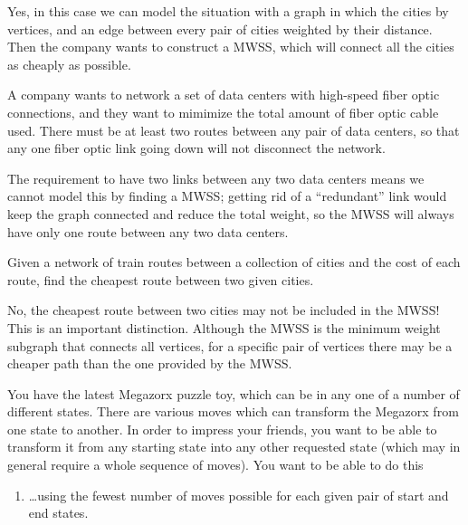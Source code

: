 \documentclass{tufte-handout}
\begin{document}
\begin{questions}
\begin{subquestions}
    \begin{answer}
      Yes, in this case we can model the situation with a graph in
      which the cities by vertices, and an edge between every pair of
      cities weighted by their distance.  Then the company wants to
      construct a MWSS, which will connect all the cities as cheaply as possible.
    \end{answer}
  \item A company wants to network a set of data centers with
    high-speed fiber optic connections, and they want to mimimize the
    total amount of fiber optic cable used. There must be at least two
    routes between any pair of data centers, so that any one fiber
    optic link going down will not disconnect the network.

    \begin{answer}
      The requirement to have two links between any two data centers
      means we cannot model this by finding a MWSS; getting rid of a
      ``redundant'' link would keep the graph connected and reduce the
      total weight, so the MWSS will always have only one route
      between any two data centers.
    \end{answer}
  \item Given a network of train routes between a collection of
    cities and the cost of each route, find the cheapest route between
    two given cities.

    \begin{answer}
      No, the cheapest route between two cities may not be included in the
      MWSS!  This is an important distinction.  Although the MWSS is
      the minimum weight subgraph that connects all vertices, for a
      specific pair of vertices there may be a cheaper path than the
      one provided by the MWSS.
    \end{answer}
  \item You have the latest Megazorx puzzle toy, which can be in any
    one of a number of different states.  There are various moves
    which can transform the Megazorx from one state to another.  In
    order to impress your friends, you want to be able to transform it
    from any starting state into any other requested state (which may
    in general require a whole sequence of moves). You want to be able
    to do this
    \begin{enumerate}[label=(\roman*)]
    \item \dots using the fewest number of moves possible for each
      given pair of start and end states.


\end{enumerate}
\end{subquestions}
\end{questions}
\end{document}
